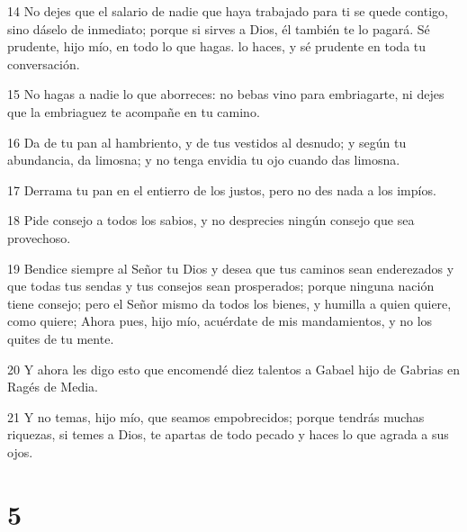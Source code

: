 \par 14 No dejes que el salario de nadie que haya trabajado para ti se quede contigo, sino dáselo de inmediato; porque si sirves a Dios, él también te lo pagará. Sé prudente, hijo mío, en todo lo que hagas. lo haces, y sé prudente en toda tu conversación.
\par 15 No hagas a nadie lo que aborreces: no bebas vino para embriagarte, ni dejes que la embriaguez te acompañe en tu camino.
\par 16 Da de tu pan al hambriento, y de tus vestidos al desnudo; y según tu abundancia, da limosna; y no tenga envidia tu ojo cuando das limosna.
\par 17 Derrama tu pan en el entierro de los justos, pero no des nada a los impíos.
\par 18 Pide consejo a todos los sabios, y no desprecies ningún consejo que sea provechoso.
\par 19 Bendice siempre al Señor tu Dios y desea que tus caminos sean enderezados y que todas tus sendas y tus consejos sean prosperados; porque ninguna nación tiene consejo; pero el Señor mismo da todos los bienes, y humilla a quien quiere, como quiere; Ahora pues, hijo mío, acuérdate de mis mandamientos, y no los quites de tu mente.
\par 20 Y ahora les digo esto que encomendé diez talentos a Gabael hijo de Gabrias en Ragés de Media.
\par 21 Y no temas, hijo mío, que seamos empobrecidos; porque tendrás muchas riquezas, si temes a Dios, te apartas de todo pecado y haces lo que agrada a sus ojos.

\chapter{5}

